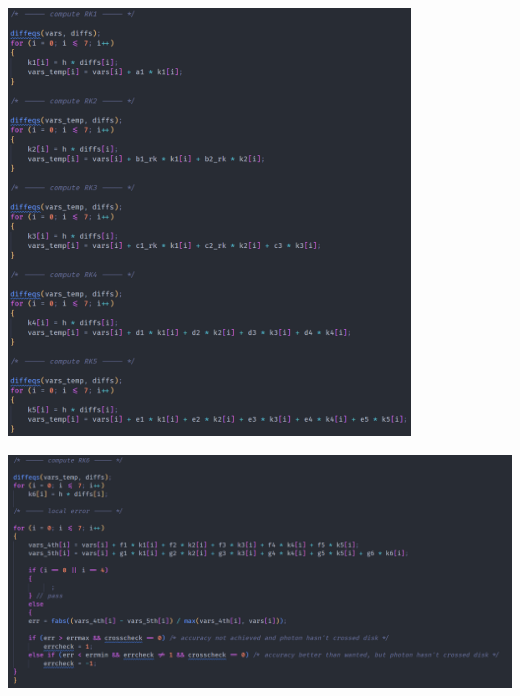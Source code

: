 \documentclass{beamer}
\begin{document}
\begin{frame}{}
    \centering

    \includegraphics[width=0.8\textwidth]{asset/rk45_a.png}
\end{frame}


\begin{frame}{}
    \centering

    \includegraphics[width=\textwidth]{asset/rk45_b.png}
\end{frame}
\end{document}
